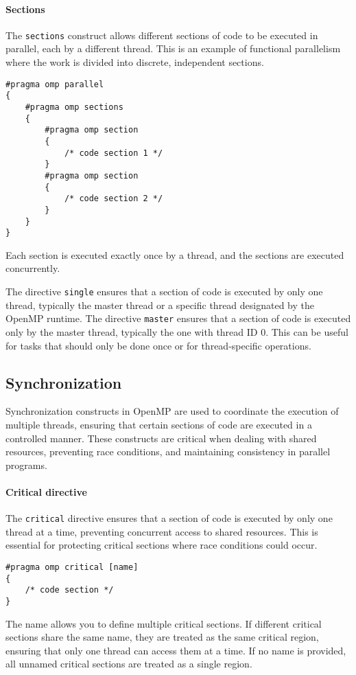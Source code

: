 \paragraph*{Sections}
The \texttt{sections} construct allows different sections of code to be executed in parallel, each by a different thread. 
This is an example of functional parallelism where the work is divided into discrete, independent sections.
\begin{lstlisting}[style=C]
#pragma omp parallel 
{
    #pragma omp sections 
    {
        #pragma omp section 
        {
            /* code section 1 */
        }
        #pragma omp section 
        {
            /* code section 2 */
        }
    }
}
\end{lstlisting}
Each section is executed exactly once by a thread, and the sections are executed concurrently.

The directive \texttt{single} ensures that a section of code is executed by only one thread, typically the master thread or a specific thread designated by the OpenMP runtime.
The directive \texttt{master} ensures that a section of code is executed only by the master thread, typically the one with thread ID 0. This can be useful for tasks that should only be done once or for thread-specific operations.

\subsection{Synchronization}
Synchronization constructs in OpenMP are used to coordinate the execution of multiple threads, ensuring that certain sections of code are executed in a controlled manner. 
These constructs are critical when dealing with shared resources, preventing race conditions, and maintaining consistency in parallel programs.

\paragraph*{Critical directive}
The \texttt{critical} directive ensures that a section of code is executed by only one thread at a time, preventing concurrent access to shared resources. 
This is essential for protecting critical sections where race conditions could occur.
\begin{lstlisting}[style=C]
#pragma omp critical [name] 
{
    /* code section */
}
\end{lstlisting}
The name allows you to define multiple critical sections. 
If different critical sections share the same name, they are treated as the same critical region, ensuring that only one thread can access them at a time.
If no name is provided, all unnamed critical sections are treated as a single region.


